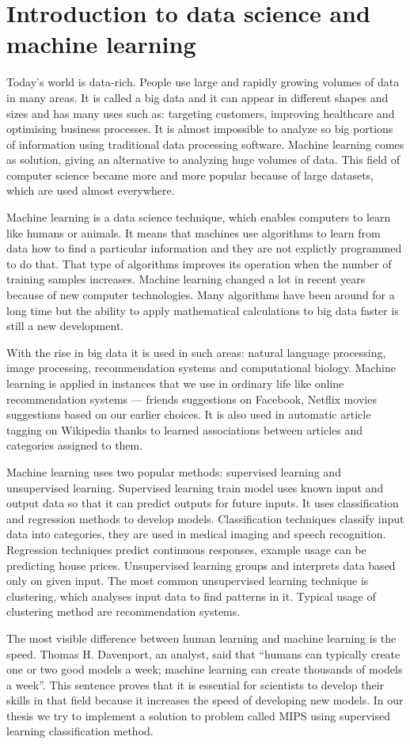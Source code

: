 \section{Introduction to data science and machine learning}

Today’s world is data-rich. 
People use large and rapidly growing volumes of data in many areas. 
It is called a big data and it can appear in different shapes and sizes and has many uses such as: targeting customers, improving healthcare and optimising business processes. 
It is almost impossible to analyze so big portions of information using traditional data processing software.
Machine learning comes as solution, giving an alternative to analyzing huge volumes of data.
This field of computer science became more and more popular because of large datasets, which are used almost everywhere.

Machine learning is a data science technique, which enables computers to learn like humans or animals.
It means that machines use algorithms to learn from data how to find a particular information and
they are not explictly programmed to do that.
That type of algorithms improves its operation when the number of training samples increases.
Machine learning changed a lot in recent years because of new computer technologies.
Many algorithms have been around for a long time but the ability to apply mathematical calculations to big data faster is still a new development.

With the rise in big data it is used in such areas: natural language processing, image processing, recommendation systems and computational biology. Machine learning is applied in instances that we use in ordinary life like online recommendation systems --- friends suggestions on Facebook, Netflix movies suggestions based on our earlier choices.
It is also used in automatic article tagging on Wikipedia thanks to learned
associations between articles and categories assigned to them.

Machine learning uses two popular methods: supervised learning and unsupervised learning.
Supervised learning train model uses known input and output data so that it can predict outputs for future inputs.
It uses classification and regression methods to develop models.
Classification techniques classify input data into categories, they are used in medical imaging and speech recognition.
Regression techniques predict continuous responses, example usage can be predicting house prices. Unsupervised learning groups and interprets data based only on given input.
The most common unsupervised learning technique is clustering,
which analyses input data to find patterns in it. Typical usage of clustering method are recommendation systems.

The most visible difference between human learning and machine learning is the speed. 
Thomas H. Davenport, an analyst, said that ``humans can typically create one or two good models a week; machine learning can create thousands of models a week''. \cite{machine_learning}
This sentence proves that it is essential for scientists to develop their skills in that field because it increases the speed of developing new models.
In our thesis we try to implement a solution to problem called MIPS using supervised learning classification method.
